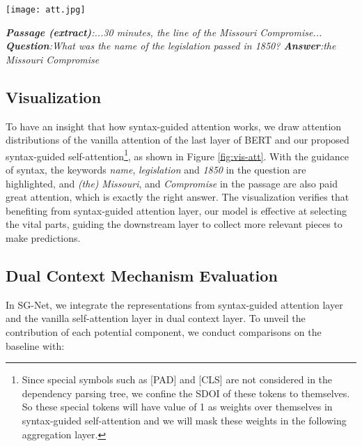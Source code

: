 \documentclass[letterpaper]{article} \usepackage{color}
\begin{document}
\begin{figure*}[htb]
	\centering
	\texttt{[image: att.jpg]}
	\\\begin{flushleft}
		\scriptsize{\emph{
				\textbf{Passage (extract)}:...30 minutes, the line of the Missouri Compromise... \textbf{Question}:What was the name of the legislation passed in 1850?  \textbf{Answer}:the Missouri Compromise} }
	\end{flushleft}
	\caption{\label{fig:vis-att} Visualization of the vanilla BERT attention (left) and syntax-guided self-attention (right). Weights of attention are selected from first head of the last attention layer. For the syntax-guided self-attention, the columns with weights represent the SDOI for each word in the row. For example, the SDOI of \textit{passed} contains \textit{\{name, of, legislation, passed\}}. Weights are normalized by SoftMax for each row. }
\end{figure*}


\subsection{Visualization}
To have an insight that how syntax-guided attention works, we draw attention distributions of the vanilla attention of the last layer of BERT and our proposed syntax-guided self-attention\footnote{Since special symbols such as [PAD] and [CLS] are not considered in the dependency parsing tree, we confine the SDOI of these tokens to themselves. So these special tokens will have value of 1 as weights over themselves in syntax-guided self-attention and we will mask these weights in the following aggregation layer.}, as shown in Figure \ref{fig:vis-att}. With the guidance of syntax, the keywords \emph{name}, \emph{legislation} and \emph{1850} in the question are highlighted, and \emph{(the)} \emph{Missouri}, and \emph{Compromise} in the passage are also paid great attention, which is exactly the right answer. The visualization verifies that benefiting from syntax-guided attention layer, our model is effective at selecting the vital parts, guiding the downstream layer to collect more relevant pieces to make predictions.



\subsection{Dual Context Mechanism Evaluation}
In SG-Net, we integrate the representations from syntax-guided attention layer and the vanilla self-attention layer in dual context layer. To unveil the contribution of each potential component, we conduct comparisons on the baseline with:
\end{document}
